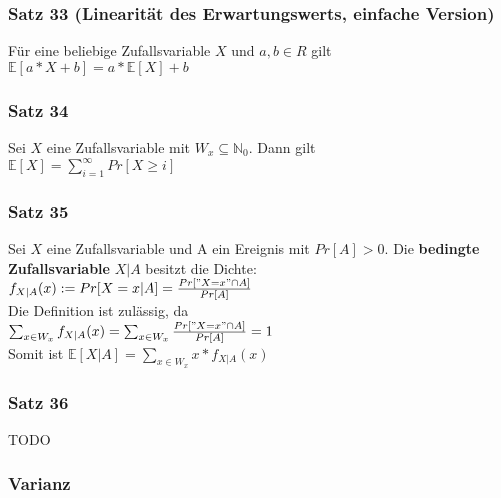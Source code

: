 \documentclass[11pt]{article}
\begin{document}
\subsubsection{Satz 33 (Linearität des Erwartungswerts, einfache Version)}
\label{sec:org2c20180}
Für eine beliebige Zufallsvariable \(X\) und \(a, b \in R\) gilt\\
\(\mathbb{E}[a * X + b] = a * \mathbb{E}[X] + b\)

\subsubsection{Satz 34}
\label{sec:org8776e12}
Sei \(X\) eine Zufallsvariable mit \(W_x \subseteq \mathbb{N}_0\). Dann gilt\\
\(\mathbb{E}[X] = \sum_{i=1}^\infty Pr[X \geq i]\)

\subsubsection{Satz 35}
\label{sec:org9b4c901}
Sei \(X\) eine Zufallsvariable und A ein Ereignis mit \(Pr[A] > 0\). Die \textbf{bedingte Zufallsvariable} \(X|A\) besitzt die Dichte:\\
\(f_{X|A}(x) := Pr[X=x|A] = \frac{Pr["X=x" \cap A]}{Pr[A]}\) \\
Die Definition ist zulässig, da \\
\(\sum_{x \in W_x} f_{X|A}(x) = \sum_{x \in W_x} \frac{Pr["X=x" \cap A]}{Pr[A]} = 1\) \\
Somit ist \(\mathbb{E}[X|A] = \sum_{x \in W_x} x * f_{X|A}(x)\)

\subsubsection{Satz 36}
\label{sec:org1ef20f8}
TODO

\subsubsection{Varianz}
\label{sec:orga7f208f}
\end{document}
